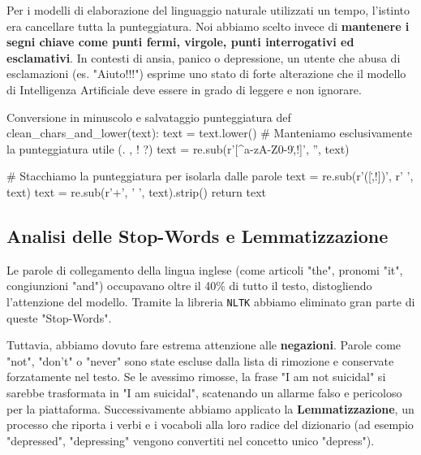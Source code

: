 Per i modelli di elaborazione del linguaggio naturale utilizzati un tempo, l'istinto era cancellare tutta la punteggiatura. Noi abbiamo scelto invece di \textbf{mantenere i segni chiave come punti fermi, virgole, punti interrogativi ed esclamativi}. In contesti di ansia, panico o depressione, un utente che abusa di esclamazioni (es. "Aiuto!!!") esprime uno stato di forte alterazione che il modello di Intelligenza Artificiale deve essere in grado di leggere e non ignorare.

\begin{codebox}{Conversione in minuscolo e salvataggio punteggiatura}
def clean_chars_and_lower(text):
    text = text.lower()
    # Manteniamo esclusivamente la punteggiatura utile (. , ! ?)
    text = re.sub(r'[^a-zA-Z0-9\s\.,!\?]', '', text)
    
    # Stacchiamo la punteggiatura per isolarla dalle parole
    text = re.sub(r'([\.,!\?])', r' \1 ', text)
    text = re.sub(r'\s+', ' ', text).strip()
    return text
\end{codebox}

\subsection{Analisi delle Stop-Words e Lemmatizzazione}
Le parole di collegamento della lingua inglese (come articoli "the", pronomi "it", congiunzioni "and") occupavano oltre il 40\% di tutto il testo, distogliendo l'attenzione del modello. Tramite la libreria \texttt{NLTK} abbiamo eliminato gran parte di queste "Stop-Words".

Tuttavia, abbiamo dovuto fare estrema attenzione alle \textbf{negazioni}. Parole come "not", "don't" o "never" sono state escluse dalla lista di rimozione e conservate forzatamente nel testo. Se le avessimo rimosse, la frase "I am not suicidal" si sarebbe trasformata in "I am suicidal", scatenando un allarme falso e pericoloso per la piattaforma. 
Successivamente abbiamo applicato la \textbf{Lemmatizzazione}, un processo che riporta i verbi e i vocaboli alla loro radice del dizionario (ad esempio "depressed", "depressing" vengono convertiti nel concetto unico "depress").

